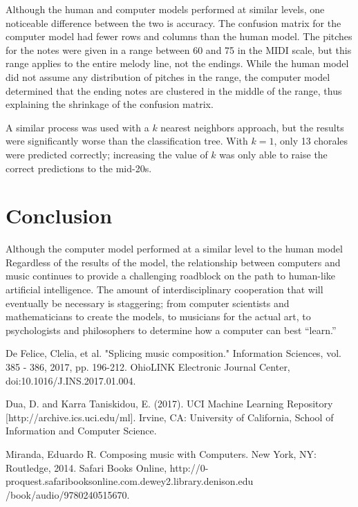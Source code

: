 \documentclass[12pt]{article}
\begin{document}
Although the human and computer models performed at similar levels, one noticeable difference between the two is accuracy. The confusion matrix for the computer model had fewer rows and columns than the human model. The pitches for the notes were given in a range between 60 and 75 in the MIDI scale, but this range applies to the entire melody line, not the endings. While the human model did not assume any distribution of pitches in the range, the computer model determined that the ending notes are clustered in the middle of the range, thus explaining the shrinkage of the confusion matrix.

A similar process was used with a $k$ nearest neighbors approach, but the results were significantly worse than the classification tree. With $k=1$, only 13 chorales were predicted correctly; increasing the value of $k$ was only able to raise the correct predictions to the mid-20s.
\section{Conclusion}
Although the computer model performed at a similar level to the human model
Regardless of the results of the model, the relationship between computers and music continues to provide a challenging roadblock on the path to human-like artificial intelligence. The amount of interdisciplinary cooperation that will eventually be necessary is staggering; from computer scientists and mathematicians to create the models, to musicians for the actual art, to psychologists and philosophers to determine how a computer can best ``learn.'' 
\newpage
\begin{thebibliography}{10}
  De Felice, Clelia, et al. "Splicing music composition." Information Sciences, vol. 385 - 386, 2017, pp. 196-212. OhioLINK Electronic Journal Center, doi:10.1016/J.INS.2017.01.004.

  Dua, D. and Karra Taniskidou, E. (2017). UCI Machine Learning Repository [http://archive.ics.uci.edu/ml]. Irvine, CA: University of California, School of Information and Computer Science.

  Miranda, Eduardo R. Composing music with Computers. New York, NY: Routledge, 2014. Safari Books Online, http://0-proquest.safaribooksonline.com.dewey2.library.denison.edu\\/book/audio/9780240515670.
\end{thebibliography}
\end{document}

